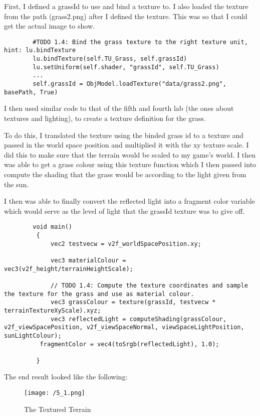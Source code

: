 \documentclass[11pt, oneside, a4paper]{article}
\begin{document}
First, I defined a grassId to use and bind a texture to. I also loaded the texture from the path (grass2.png) after I defined the texture. This was so that I could get the actual image to show.
 
\begin{lstlisting}  
        #TODO 1.4: Bind the grass texture to the right texture unit, hint: lu.bindTexture
        lu.bindTexture(self.TU_Grass, self.grassId)
        lu.setUniform(self.shader, "grassId", self.TU_Grass)
        ...
        self.grassId = ObjModel.loadTexture("data/grass2.png", basePath, True)
\end{lstlisting}

I then used similar code to that of the fifth and fourth lab (the ones about textures and lighting), to create a texture definition for the grass.

To do this, I translated the texture using the binded grass id to a texture and passed in the world space position and multiplied it with the xy texture scale. I did this to make sure that the terrain would be scaled to my game's world. I then was able to get a grass colour using this texture function which I then passed into compute the shading that the grass would be according to the light given from the sun.

I then was able to finally convert the reflected light into a fragment color variable which would serve as the level of light that the grassId texture was to give off.

\begin{lstlisting}  
        void main() 
         {
             vec2 testvecw = v2f_worldSpacePosition.xy;
            
             vec3 materialColour = vec3(v2f_height/terrainHeightScale);
                
             // TODO 1.4: Compute the texture coordinates and sample the texture for the grass and use as material colour.
             vec3 grassColour = texture(grassId, testvecw * terrainTextureXyScale).xyz;
             vec3 reflectedLight = computeShading(grassColour, v2f_viewSpacePosition, v2f_viewSpaceNormal, viewSpaceLightPosition, sunLightColour);
	      fragmentColor = vec4(toSrgb(reflectedLight), 1.0);

         }
\end{lstlisting}
 
 The end result looked like the following:
 \begin{figure}[!ht]
	\centerline{\texttt{[image: /5\_1.png]}}
	\caption{The Textured Terrain}
	\label{fig:figure5}
\end{figure}
\end{document}
